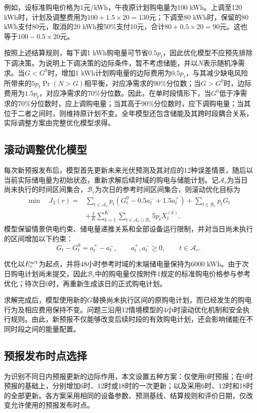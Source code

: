 \documentclass[UTF8,fontset=none,12pt,a4paper]{ctexart}
\begin{document}
例如，设标准购电价格为1元/kWh，午夜原计划购电量为100 kWh。上调至120 kWh时，计划及调整费用为$100+1.5\times20=130$元；下调至80 kWh时，保留的80 kWh支付80元，取消的20 kWh按50\%支付10元，合计$80+0.5\times20=90$元。这也等于$100-0.5\times20$元。

按照上述结算规则，每下调1 kWh购电量可节省$0.5p_t$，因此优化模型不应预先排除下调决策。为说明上下调决策的边际条件，暂不考虑储能，并以$N$表示随机净需求。当$G<G^0$时，增加1 kWh计划购电量的边际费用为$0.5p_t$，与其减少缺电风险所带来的$5p_t\Pr(N>G)$相平衡，对应净需求的90\%分位数；当$G>G^0$时，边际费用为$1.5p_t$，对应净需求的70\%分位数。因此，在单时段情形下，当$G^0$低于净需求的70\%分位数时，应上调购电量；当其高于90\%分位数时，应下调购电量；当其位于二者之间时，则维持原计划不变。全年模型还包含储能及其跨时段耦合关系，实际调整方案由完整优化模型求得。

\subsection{滚动调整优化模型}
每次新预报发布后，模型首先更新未来光伏预测及其对应的12种误差情景，随后以当前实际储电量为初始状态，重新求解后续时域的购电与储能计划。记$\mathcal A_r$为当日尚未执行的时间区间集合，$\mathcal B_r$为次日的参考时间区间集合，则滚动优化目标为
\begin{align}
 \min\quad J_3(r)={}&
 \sum_{t\in\mathcal A_r}p_t(G_t^0-0.5a_t^-+1.5a_t^+)
 +\sum_{t\in\mathcal B_r}p_tG_t\nonumber\\
 &+\frac1K\sum_{k=1}^K\sum_{t\in\mathcal A_r\cup\mathcal B_r}5p_tX_t^{(k)}.
 \label{eq:updateobj}
\end{align}
模型保留情景供电约束、储电量递推关系和全部设备运行限制，并对当日尚未执行的区间增加以下约束：
\[
 G_t-G_t^0=a_t^+-a_t^-,\qquad a_t^+,a_t^-\ge0,\qquad t\in\mathcal A_r.
\]

优化以$E_r^{\rm act}$为起点，并将48小时参考时域的末端储电量保持为6000 kWh。由于次日购电计划尚未提交，因此$\mathcal B_r$中的购电量仅按附件1规定的标准购电价格参与参考优化；待次日0时，再重新生成该日的正式购电计划。

求解完成后，模型使用新的$G$替换尚未执行区间的原购电计划，而已经发生的购电行为及相应费用保持不变。问题三沿用12情境模型的4小时滚动优化机制和安全执行规则。由此，新预报不仅能够改变后续时段的有效购电计划，还会影响储能在不同时段之间的能量配置。

\subsection{预报发布时点选择}
为识别不同日内预报更新的边际作用，本文设置五种方案：仅使用0时预报；在0时预报的基础上，分别增加6时、12时或18时的一次更新；以及采用6时、12时和18时的全部更新。各方案采用相同的设备参数、预测基线、结算规则和评价日期，仅改变允许使用的预报发布时点。
\end{document}
